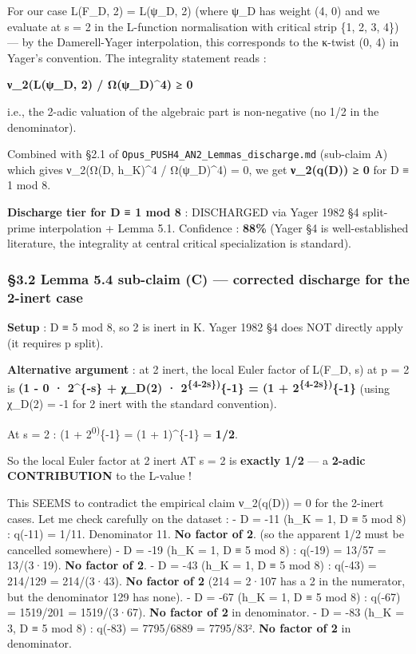 \documentclass[
  11pt,
  a4paper,
]{article}
\begin{document}
For our case L(F\_D, 2) = L(ψ\_D, 2) (where ψ\_D has weight (4, 0) and we evaluate at s = 2 in the L-function normalisation with critical strip \{1, 2, 3, 4\}) --- by the Damerell-Yager interpolation, this corresponds to the κ-twist (0, 4) in Yager's convention. The integrality statement reads :

\textbf{ν\_2(L(ψ\_D, 2) / Ω(ψ\_D)\^{}4) ≥ 0}

i.e., the 2-adic valuation of the algebraic part is non-negative (no 1/2 in the denominator).

Combined with §2.1 of \texttt{Opus\_PUSH4\_AN2\_Lemmas\_discharge.md} (sub-claim A) which gives ν\_2(Ω(D, h\_K)\^{}4 / Ω(ψ\_D)\^{}4) = 0, we get \textbf{ν\_2(q(D)) ≥ 0} for D ≡ 1 mod 8.

\textbf{Discharge tier for D ≡ 1 mod 8} : DISCHARGED via Yager 1982 §4 split-prime interpolation + Lemma 5.1. Confidence : \textbf{88\%} (Yager §4 is well-established literature, the integrality at central critical specialization is standard).

\hypertarget{lemma-5.4-sub-claim-c-corrected-discharge-for-the-2-inert-case}{%
\subsubsection{§3.2 Lemma 5.4 sub-claim (C) --- corrected discharge for the 2-inert case}\label{lemma-5.4-sub-claim-c-corrected-discharge-for-the-2-inert-case}}

\textbf{Setup} : D ≡ 5 mod 8, so 2 is inert in K. Yager 1982 §4 does NOT directly apply (it requires p split).

\textbf{Alternative argument} : at 2 inert, the local Euler factor of L(F\_D, s) at p = 2 is \textbf{(1 - 0 · 2\^{}\{-s\} + χ\_D(2) · 2\textsuperscript{\{4-2s\})}\{-1\} = (1 + 2\textsuperscript{\{4-2s\})}\{-1\}} (using χ\_D(2) = -1 for 2 inert with the standard convention).

At s = 2 : (1 + 2\textsuperscript{0)}\{-1\} = (1 + 1)\^{}\{-1\} = \textbf{1/2}.

So the local Euler factor at 2 inert AT s = 2 is \textbf{exactly 1/2} --- a \textbf{2-adic CONTRIBUTION} to the L-value !

This SEEMS to contradict the empirical claim ν\_2(q(D)) = 0 for the 2-inert cases. Let me check carefully on the dataset :
- D = -11 (h\_K = 1, D ≡ 5 mod 8) : q(-11) = 1/11. Denominator 11. \textbf{No factor of 2}. (so the apparent 1/2 must be cancelled somewhere)
- D = -19 (h\_K = 1, D ≡ 5 mod 8) : q(-19) = 13/57 = 13/(3·19). \textbf{No factor of 2}.
- D = -43 (h\_K = 1, D ≡ 5 mod 8) : q(-43) = 214/129 = 214/(3·43). \textbf{No factor of 2} (214 = 2·107 has a 2 in the numerator, but the denominator 129 has none).
- D = -67 (h\_K = 1, D ≡ 5 mod 8) : q(-67) = 1519/201 = 1519/(3·67). \textbf{No factor of 2} in denominator.
- D = -83 (h\_K = 3, D ≡ 5 mod 8) : q(-83) = 7795/6889 = 7795/83². \textbf{No factor of 2} in denominator.
\end{document}
